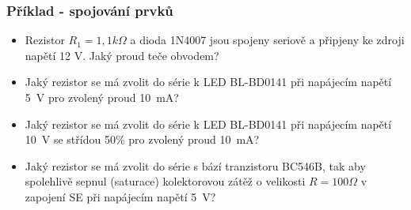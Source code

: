 \documentclass{beamer}
\begin{document}
  \begin{frame}
    \frametitle{Příklad - spojování prvků}
    
    \begin{itemize}
      \item Rezistor $R_1 = 1,1 k\Omega$ a dioda 1N4007  jsou spojeny 
      seriově a připjeny ke zdroji napětí 12 V. Jaký proud teče obvodem?
      \item Jaký rezistor se má zvolit do série k LED BL-BD0141 při napájecím
      napětí 5~V pro zvolený proud 10~mA?
      \item Jaký rezistor se má zvolit do série k LED BL-BD0141 při napájecím
      napětí 10~V se střídou 50\% pro zvolený proud 10~mA?
      \item Jaký rezistor se má zvolit do série s bází tranzistoru BC546B, tak
      aby spolehlivě sepnul (saturace) kolektorovou zátěž o velikosti 
      $R = 100\Omega$ v zapojení SE při napájecím napětí 5~V?
    \end{itemize}
    
  \end{frame}
\end{document}

